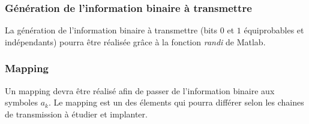 \documentclass[frenchb]{article}
\begin{document}
\subsubsection{Génération de l'information binaire à transmettre}
La génération de l'information binaire à transmettre (bits $0$ et $1$ équiprobables et indépendants) pourra être réalisée grâce à la fonction \emph{randi} de Matlab.
%


\subsubsection{Mapping}
Un mapping devra être réalisé afin de passer de l'information binaire aux symboles $a_k$. Le mapping est un des élements qui pourra différer selon les chaines de transmission à étudier et implanter.
\end{document}
